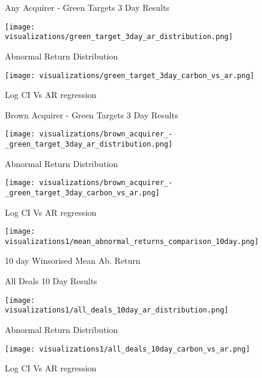 \documentclass[a4paper]{article}
\begin{document}
\begin{figure}[htbp]
\caption*{Any Acquirer - Green Targets 3 Day Results}
   \begin{minipage}{0.48\textwidth}
        \centering
        \texttt{[image: visualizations/green\_target\_3day\_ar\_distribution.png]}
        \caption{Abnormal Return Distribution}
        \label{fig:3day_GWARD}
    \end{minipage}
    \hfill
    \begin{minipage}{0.48\textwidth}
        \centering
        \texttt{[image: visualizations/green\_target\_3day\_carbon\_vs\_ar.png]}
        \caption{Log CI Vs AR regression}
        \label{fig:3day_GCIAR}
    \end{minipage}
\end{figure}

\begin{figure}[htbp]
\caption*{Brown Acquirer - Green Targets 3 Day Results}
   \begin{minipage}{0.48\textwidth}
        \centering
        \texttt{[image: visualizations/brown\_acquirer\_-\_green\_target\_3day\_ar\_distribution.png]}
        \caption{Abnormal Return Distribution}
        \label{fig:3day_BWARD}
    \end{minipage}
    \hfill
    \begin{minipage}{0.48\textwidth}
        \centering
        \texttt{[image: visualizations/brown\_acquirer\_-\_green\_target\_3day\_carbon\_vs\_ar.png]}
        \caption{Log CI Vs AR regression}
        \label{fig:3day_BCIAR}
    \end{minipage}
\end{figure}

\begin{figure}[htbp]
    \centering
    \texttt{[image: visualizations1/mean\_abnormal\_returns\_comparison\_10day.png]}
    \caption{10 day Winsorised Mean Ab. Return }
    \label{fig:10_WinMAR}
\end{figure}
 

\begin{figure}[htbp]
\caption*{All Deals 10 Day Results}
   \begin{minipage}{0.48\textwidth}
        \centering
        \texttt{[image: visualizations1/all\_deals\_10day\_ar\_distribution.png]}
        \caption{Abnormal Return Distribution}
        \label{fig:10day_AWARD}
    \end{minipage}
    \hfill
    \begin{minipage}{0.48\textwidth}
        \centering
        \texttt{[image: visualizations1/all\_deals\_10day\_carbon\_vs\_ar.png]}
        \caption{Log CI Vs AR regression}
        \label{fig:10day_ACIAR}
    \end{minipage}
\end{figure}
\end{document}
